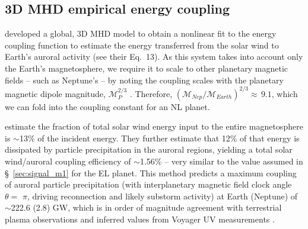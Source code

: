\documentclass[apjl]{emulateapj}
\begin{document}
\subsection{3D MHD empirical energy coupling}
\label{sec:signal_m2}
 
\citet{Wang2014} developed a global, 3D MHD model to obtain a nonlinear fit to the energy coupling function to estimate the energy transferred from the solar wind to Earth's auroral activity (see their Eq.~13). %
% 
As this system takes into account only the Earth's magnetosphere, we require it to scale to other planetary magnetic fields -- such as Neptune's -- by noting the coupling scales with the planetary magnetic dipole magnitude, $\mathcal{M}_P^{2/3}$ \citep{Vasyliunas1982}. Therefore, $(\mathcal{M}_{Nep}/\mathcal{M}_{Earth})^{2/3}\approx \, 9.1$, which we can fold into the coupling constant for an NL planet.%
 
\citet{Wang2014} estimate the fraction of total solar wind energy input to the entire magnetosphere is $\sim$13\% of the incident energy. They further estimate that 12\% of that energy is dissipated by particle precipitation in the auroral regions, yielding a total solar wind/auroral coupling efficiency of $\sim$1.56\% -- very similar to the value assumed in \S~\ref{sec:signal_m1} for the EL planet. This method predicts a maximum coupling of auroral particle precipitation (with interplanetary magnetic field clock angle $\theta =$ $\pi$, driving reconnection and likely substorm activity) at Earth (Neptune) of $\sim$222.6 (2.8) GW, which is in order of magnitude agreement with terrestrial plasma observations \citep[e.g.][]{Hubert2002} and inferred values from Voyager UV measurements \citep[e.g.][]{Sandel1990,Mauk1994}. 
\end{document}
